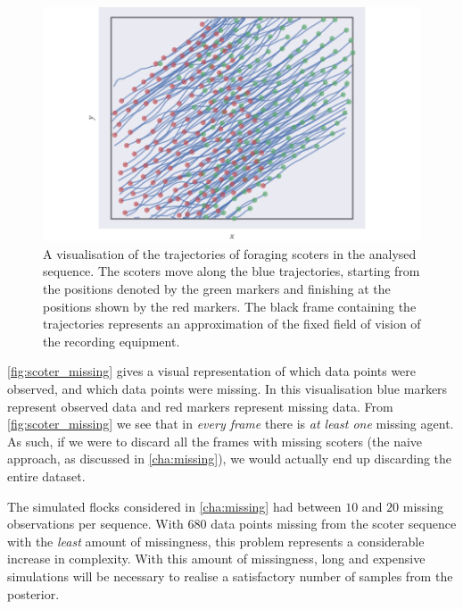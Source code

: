 \begin{figure}[tb]
  \includegraphics{data_00_traj.pdf}
  \caption{A visualisation of the trajectories of foraging scoters in the
      analysed sequence. The scoters move along the blue trajectories, starting
      from the positions denoted by the green markers and finishing at the
      positions shown by the red markers. The black frame containing the
      trajectories represents an approximation of the fixed field of vision of the
      recording equipment.}
  \label{fig:scoter_traj}
\end{figure}

\cref{fig:scoter_missing} gives a visual representation of which data points
were observed, and which data points were missing. In this visualisation blue
markers represent observed data and red markers represent missing data. From
\cref{fig:scoter_missing} we see that in \emph{every frame} there is \emph{at
least one} missing agent. As such, if we were to discard all the frames with
missing scoters (the naive approach, as discussed in \cref{cha:missing}), we
would actually end up discarding the entire dataset.

The simulated flocks considered in \cref{cha:missing} had between $10$ and $20$
missing observations per sequence. With $680$ data points missing from the
scoter sequence with the \emph{least} amount of missingness, this problem
represents a considerable increase in complexity. With this amount of
missingness, long and expensive simulations will be necessary to realise a
satisfactory number of samples from the posterior.

